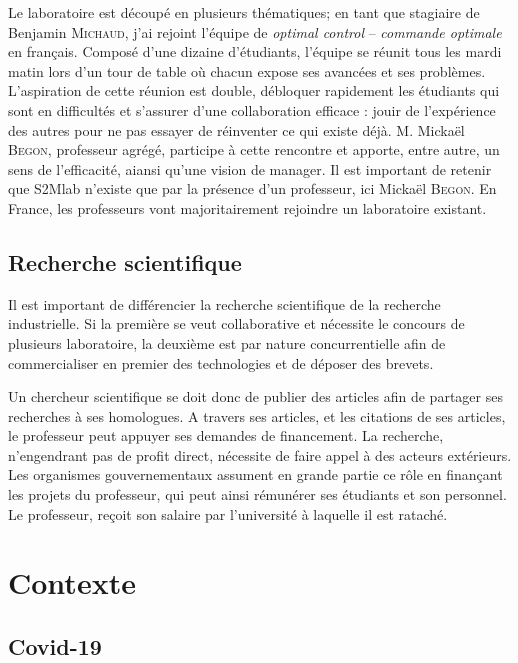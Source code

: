 Le laboratoire est découpé en plusieurs thématiques; en tant que stagiaire de Benjamin \textsc{Michaud}, j'ai rejoint l'équipe de \emph{optimal control} -- \emph{commande optimale} en français. Composé d'une dizaine d'étudiants, l'équipe se réunit tous les mardi matin lors d'un tour de table où chacun expose ses avancées et ses problèmes. L'aspiration de cette réunion est double, débloquer rapidement les étudiants qui sont en difficultés et s'assurer d'une collaboration efficace : jouir de l'expérience des autres pour ne pas essayer de réinventer ce qui existe déjà. M. Mickaël \textsc{Begon}, professeur agrégé, participe à cette rencontre et apporte, entre autre, un sens de l'efficacité, aiansi qu'une vision de manager.
Il est important de retenir que S2Mlab n'existe que par la présence d'un professeur, ici Mickaël \textsc{Begon}. En France, les professeurs vont majoritairement rejoindre un laboratoire existant.


        \section{Recherche scientifique}
        
Il est important de différencier la recherche scientifique de la recherche industrielle. Si la première se veut collaborative et nécessite le concours de plusieurs laboratoire, la deuxième est par nature concurrentielle afin de commercialiser en premier des technologies et de déposer des brevets.


Un chercheur scientifique se doit donc de publier des articles afin de partager ses recherches à ses homologues. A travers ses articles, et les citations de ses articles, le professeur peut appuyer ses demandes de financement. La recherche, n'engendrant pas de profit direct, nécessite de faire appel à des acteurs extérieurs. Les organismes gouvernementaux assument en grande partie ce rôle en finançant les projets du professeur, qui peut ainsi rémunérer ses étudiants et son personnel. Le professeur, reçoit son salaire par l'université à laquelle il est rataché.



    \chapter{Contexte}
        \section{Covid-19}
        
